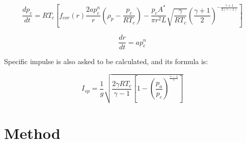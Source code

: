\documentclass[letterpaper,12pt]{article}
\begin{document}
\begin{equation}
	\boxed{\frac{dp_c}{dt} = RT_c[f_{cor}(r)\frac{2ap_c^{n}}{r}(\rho_{p} - \frac{p_c}{RT_c}) - \frac{p_cA^{*}}{\pi r^{2}L}\sqrt{\frac{\gamma}{RT_c}}(\frac{\gamma +1}{2})^{-\frac{\gamma +1}{2(\gamma -1)}}]}
\end{equation}

\begin{equation}
	\boxed{\frac{dr}{dt} = ap_c^{n}}
	\label{eqn:pres}
\end{equation}

Specific impulse is also asked to be calculated, and its formula is:

\begin{equation}
	\boxed{I_{sp} = \frac{1}{g}\sqrt{\frac{2\gamma RT_c}{\gamma -1}[1-(\frac{p_a}{p_c})^{\frac{\gamma -1}{\gamma}}]}}
	\label{eq:isp}
\end{equation}

\section{Method}
\end{document}
